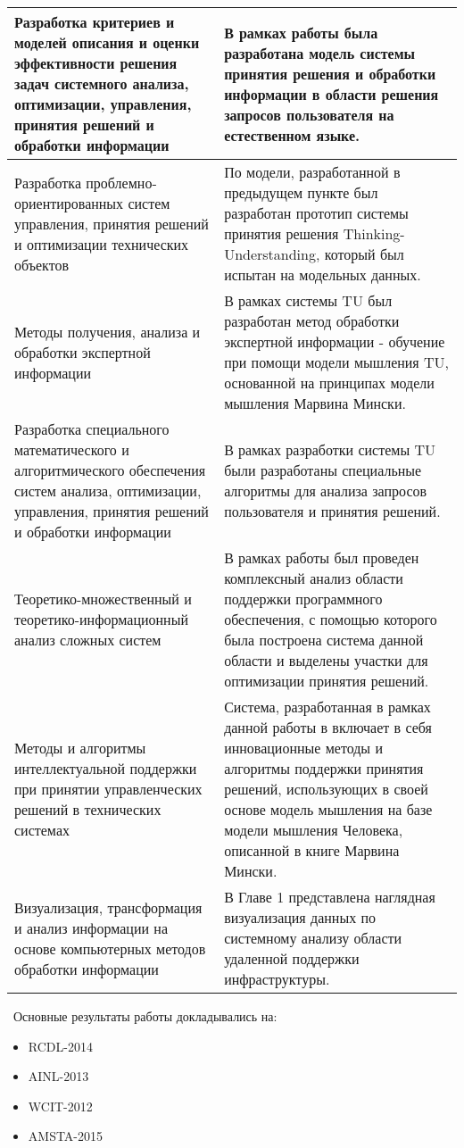 \begin{longtable}{|p{7cm}|p{9cm}|}
\hline \hline
\endlastfoot
\hline
   Разработка критериев и моделей описания и оценки эффективности решения задач системного анализа, оптимизации, управления, принятия решений и обработки информации & В рамках работы была разработана модель системы принятия решения и обработки информации в области решения запросов пользователя на естественном языке. \\
   \hline
   Разработка проблемно-ориентированных систем управления, принятия решений и оптимизации технических объектов & По модели, разработанной в предыдущем пункте был разработан прототип системы принятия решения Thinking-Understanding, который был испытан на модельных данных.\\
   \hline
   Методы получения, анализа и обработки экспертной информации & В рамках системы TU был разработан метод обработки экспертной информации - обучение при помощи модели мышления TU, основанной на принципах модели мышления Марвина Мински. \\
   \hline
   Разработка специального математического и алгоритмического обеспечения систем анализа, оптимизации, управления, принятия решений и обработки информации & В рамках разработки системы TU были разработаны специальные алгоритмы для анализа запросов пользователя и принятия решений.\\
  \hline 
  Теоретико-множественный и теоретико-информационный анализ сложных систем & В рамках работы был проведен комплексный анализ области поддержки программного обеспечения, с помощью которого была построена система данной области и выделены участки для оптимизации принятия решений.\\
  \hline
  Методы и алгоритмы интеллектуальной поддержки при принятии управленческих решений в технических системах & Система, разработанная в рамках данной работы в включает в себя инновационные методы и алгоритмы поддержки принятия решений, использующих в своей основе модель мышления на базе модели мышления Человека, описанной в книге Марвина Мински. \\ 
  \hline
  Визуализация, трансформация и анализ информации на основе компьютерных методов обработки информации & В Главе 1 представлена наглядная визуализация данных по системному анализу области удаленной поддержки инфраструктуры. \\
  \hline	
\end{longtable}


\probation\
Основные результаты работы докладывались на:
\begin{itemize}
	\item RCDL-2014
	\item AINL-2013
	\item WCIT-2012
	\item AMSTA-2015
\end{itemize}

